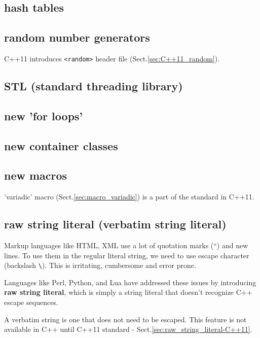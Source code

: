 \subsection{hash tables}

\subsection{random  number generators}

C++11 introduces \verb!<random>! header file (Sect.\ref{sec:C++11_random}).

\subsection{STL (standard threading library)}

\subsection{new 'for loops'}

\subsection{new container classes}
\label{sec:C++11_containers}


\subsection{new macros}

'variadic' macro (Sect.\ref{sec:macro_variadic}) is a part of the standard in
C++11.


\subsection{raw string literal (verbatim string literal)}
\label{sec:raw-string-literal}
Markup languages like HTML, XML use a lot of quotation marks (``) and new lines.
To use them in the regular literal string, we need to use escape character
(backslash \verb!\!). This is irritating, cumbersome and error prone. 

Languages like Perl, Python, and Lua have addressed these issues by introducing
{\bf raw string literal}, which is simply a string literal that doesn't
recognize C++ escape sequences. 

A verbatim string is one that does not need to be escaped.
This feature is not available in C++ until C++11 standard -
Sect.\ref{sec:raw_string_literal-C++11}.


